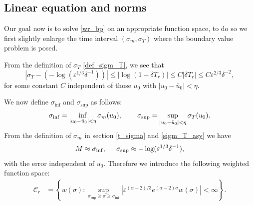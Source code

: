 \documentclass[letterpaper,11pt]{article}
\newcommand{\eps}{\varepsilon}
\numberwithin{equation}{section}
\theoremstyle{plain}
\begin{document}
\subsection{Linear equation and norms}




Our goal now is to solve \eqref{wr_bp} on an appropriate function space, to do so we first slightly enlarge the time interval $(\sigma_m, \sigma_T)$ where the boundary value problem is posed.

From the definition of $\sigma_T$ \eqref{def_sigm_T}, we see that
\begin{equation}\label{sigm_T_asy}
|\sigma_T -(-\log(\eps^{1/3}\delta^{-1}))| \le |\log(1-\delta T_r)| \le  C|\delta T_r|\le C\eps^{2/3}\delta^{-2},
\end{equation} 
for some constant $C$ independent of those $u_0$ with $|u_0-\bar{u}_0|<\eta$.

We now define $\sigma_{\inf}$ and $\sigma_{\sup}$ as follows:
\[
\sigma_{\inf} = \inf_{|u_0-\bar{u}_0|<\eta}\sigma_m(u_0), \hspace{0.3in} \sigma_{\sup} = \sup_{|u_0-\bar{u}_0|<\eta}\sigma_T(u_0).
\]
From the definition of $\sigma_m$ in section \ref{t_sigma} and \eqref{sigm_T_asy} we have
\[
M \approx\sigma_{\inf} , \hspace{0.2in} \sigma_{\sup} \approx -\log(\eps^{1/3}\delta^{-1}),
\] with the error independent of $u_0$. 
Therefore we introduce the following weighted function space:
\begin{align*}
\mathcal{C}_{r} &= \left\{ w(\sigma) : \sup_{\sigma_{\sup}\ge \sigma\ge \sigma_{\inf}} \left|\eps^{(\alpha-2)/3} e^{(\alpha-2)\sigma}w(\sigma)\right| < \infty \right\}. \\
\end{align*}
\end{document}
